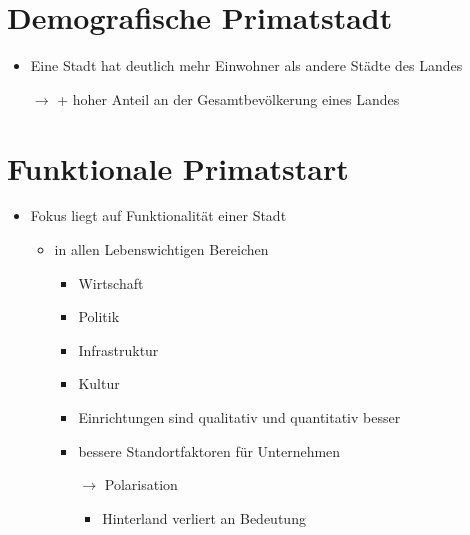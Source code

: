 \documentclass[12pt,a4paper]{report}
\begin{document}
	\section{Demografische Primatstadt}
	\begin{itemize}
		\item Eine Stadt hat deutlich mehr Einwohner als andere Städte des Landes
		\item[$\to$] + hoher Anteil an der Gesamtbevölkerung eines Landes
	\end{itemize}
	\section{Funktionale Primatstart}
	\begin{itemize}
		\item Fokus liegt auf Funktionalität einer Stadt
		\begin{itemize}
			\item in allen Lebenswichtigen Bereichen
			\begin{itemize}
				\item Wirtschaft
				\item Politik
				\item Infrastruktur
				\item Kultur
				\item Einrichtungen sind qualitativ und quantitativ besser
				\item bessere Standortfaktoren für Unternehmen
				\item[$\to$] Polarisation
				\begin{itemize}
					\item Hinterland verliert an Bedeutung
				\end{itemize} 
			\end{itemize}
		\end{itemize}
	\end{itemize}
\end{document}
